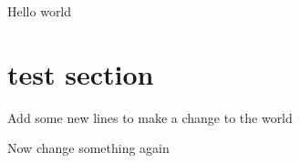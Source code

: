 \documentclass{article}
\begin{document}
	Hello world
	
	\section{test section}
	
	Add some new lines to make a change to the world

Now change something again
\end{document}
